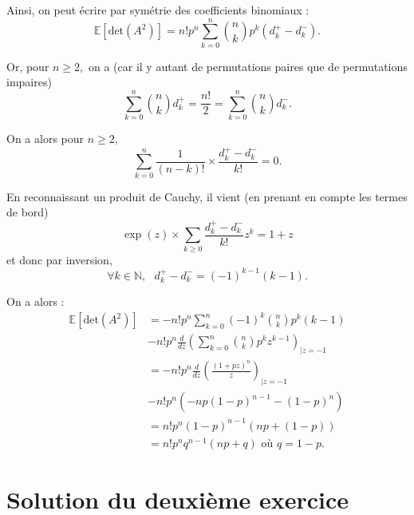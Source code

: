 \begin{enumerate}
Ainsi, on peut écrire par symétrie des coefficients binomiaux : $$\mathbb{E}[\mbox{det}(A^{2})] =  n!p^{n}\sum_{k=0}^{n}\binom{n}{k}p^{k}\left(d_{k}^{+}-d_{k}^{-}\right).$$

Or, pour $n\geq 2,$ on a (car il y autant de permutations paires que de permutations impaires) $$\sum_{k=0}^{n}\binom{n}{k}d_{k}^{+}=\frac{n!}{2}=\sum_{k=0}^{n}\binom{n}{k}d_{k}^{-}.$$

On a alors pour $n\geq 2,$ $$\sum_{k=0}^{n}\frac{1}{(n-k)!}\times \frac{d_{k}^{+}-d_{k}^{-}}{k!}=0.$$

En reconnaissant un produit de Cauchy, il vient (en prenant en compte les termes de bord) 
$$\exp(z)\times \sum_{k\geq 0}\frac{d_{k}^{+}-d_{k}^{-}}{k!}z^{k}=1+z$$ et donc par inversion, $$\forall k\in\mathbb{N},\mbox{ } d_{k}^{+}-d_{k}^{-}=(-1)^{k-1}(k-1).$$

On a alors :
\begin{align*}
\mathbb{E}[\mbox{det}(A^{2})] & =  -n!p^{n}\sum_{k=0}^{n}(-1)^{k}\binom{n}{k}p^{k}(k-1)\\
& -n!p^{n}\frac{d}{dz}\left(\sum_{k=0}^{n}\binom{n}{k}p^{k}z^{k-1}\right)_{|z=-1}\\
& = -n!p^{n}\frac{d}{dz}\left(\frac{(1+pz)^{n}}{z}\right)_{|z=-1}\\
& -n!p^{n}\left(-np(1-p)^{n-1}-(1-p)^{n}\right)\\
& =n!p^{n}(1-p)^{n-1}(np+(1-p))\\
& = n!p^{n}q^{n-1}(np+q) \mbox{ où } q=1-p.
\end{align*}

\end{enumerate}

\section{Solution du deuxième exercice}

